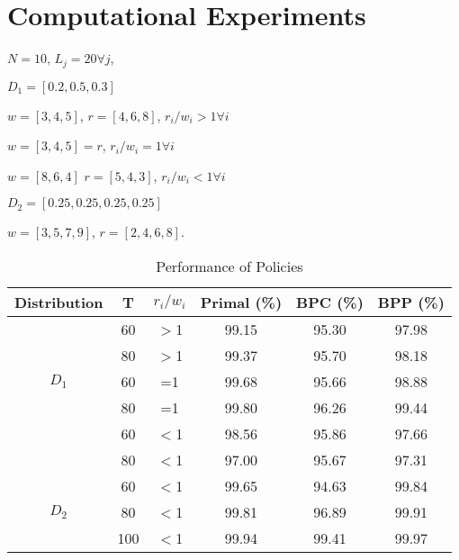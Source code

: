 \section{Computational Experiments}\label{sec_result}

$N =10$, $L_{j} =20 \forall j$,

$D_1 = [0.2, 0.5, 0.3]$

$w = [3, 4, 5]$, $r = [4, 6, 8]$, $r_i/w_i > 1 \forall i$

$w = [3, 4, 5] = r$, $r_i/w_i = 1 \forall i$

$w = [8, 6, 4]$  $r = [5, 4, 3]$, $r_i/w_i < 1 \forall i$

$D_2 = [0.25, 0.25, 0.25, 0.25]$

$w = [3, 5, 7, 9]$, $r = [2, 4, 6, 8]$.

\begin{table}[h]
  \centering
  \caption{Performance of Policies}\label{tab_perf}
  \begin{tabular}{cccccc}
  \hline
  \hline
  Distribution & T & $r_i/w_i$ & Primal (\%) & BPC (\%) & BPP (\%)  \\
  \hline
  \multirow{5}{*}{$D_1$} & 60  & $>$1 & 99.15 & 95.30 & 97.98  \\
                         & 80  & $>$1 & 99.37 & 95.70 & 98.18  \\
                         & 60  & =1   & 99.68 & 95.66 & 98.88  \\  %
                         & 80  & =1   & 99.80 & 96.26 & 99.44  \\
                         & 60  & $<$1 & 98.56 & 95.86 & 97.66 \\
                         & 80  & $<$1 & 97.00 & 95.67 & 97.31  \\
    \hline
    \multirow{5}{*}{$D_2$} & 60  & $<$1 & 99.65 &  94.63 & 99.84  \\
     & 80  & $<$1 & 99.81      & 96.89       &  99.91     \\
     & 100 & $<$1 & 99.94 & 99.41  & 99.97 \\
  \hline
  \end{tabular}
\end{table}




